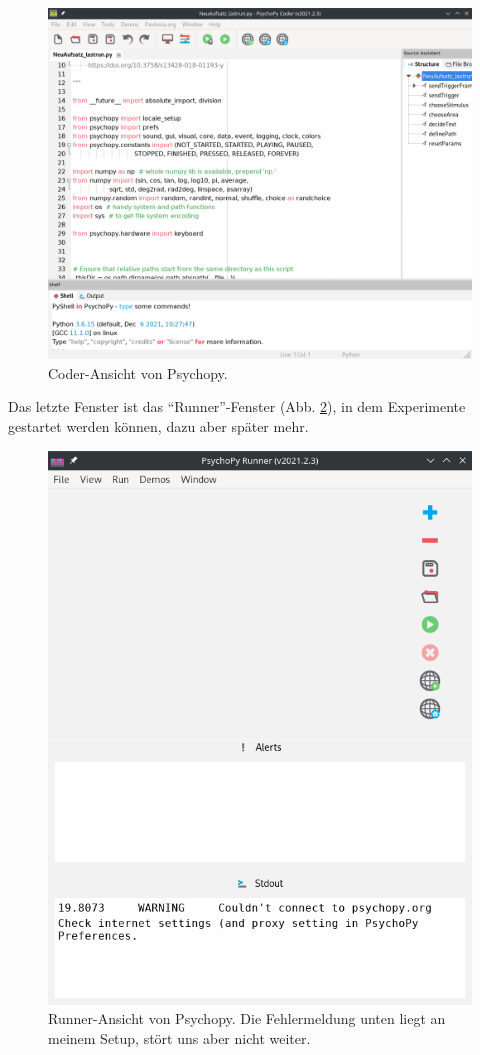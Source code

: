 \documentclass[
]{book}
\begin{document}
\begin{figure}

{\centering \includegraphics[width=.8\textwidth]{imgs/Coder} 

}

\caption{Coder-Ansicht von Psychopy.}\label{fig:Coder1}
\end{figure}

Das letzte Fenster ist das ``Runner''-Fenster (Abb. \ref{fig:Runner1}), in dem Experimente gestartet werden können, dazu aber später mehr.



\begin{figure}

{\centering \includegraphics[width=.8\textwidth]{imgs/Screenshot_20211212_145801} 

}

\caption{Runner-Ansicht von Psychopy. Die Fehlermeldung unten liegt an meinem Setup, stört uns aber nicht weiter.}\label{fig:Runner1}
\end{figure}
\end{document}
